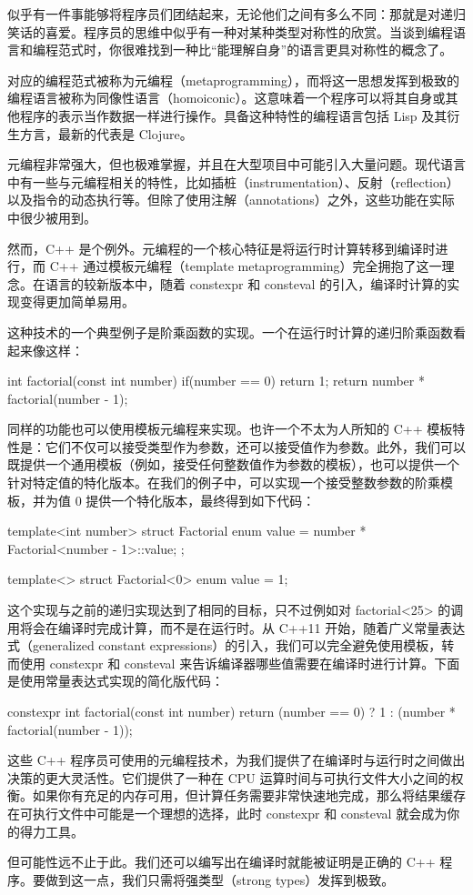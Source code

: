 
似乎有一件事能够将程序员们团结起来，无论他们之间有多么不同：那就是对递归笑话的喜爱。程序员的思维中似乎有一种对某种类型对称性的欣赏。当谈到编程语言和编程范式时，你很难找到一种比“能理解自身”的语言更具对称性的概念了。

对应的编程范式被称为元编程（metaprogramming），而将这一思想发挥到极致的编程语言被称为同像性语言（homoiconic）。这意味着一个程序可以将其自身或其他程序的表示当作数据一样进行操作。具备这种特性的编程语言包括 Lisp 及其衍生方言，最新的代表是 Clojure。

元编程非常强大，但也极难掌握，并且在大型项目中可能引入大量问题。现代语言中有一些与元编程相关的特性，比如插桩（instrumentation）、反射（reflection）以及指令的动态执行等。但除了使用注解（annotations）之外，这些功能在实际中很少被用到。

然而，C++ 是个例外。元编程的一个核心特征是将运行时计算转移到编译时进行，而 C++ 通过模板元编程（template metaprogramming）完全拥抱了这一理念。在语言的较新版本中，随着 constexpr 和 consteval 的引入，编译时计算的实现变得更加简单易用。

这种技术的一个典型例子是阶乘函数的实现。一个在运行时计算的递归阶乘函数看起来像这样：

\begin{cpp}
int factorial(const int number){
  if(number == 0) return 1;
  return number * factorial(number - 1);
}
\end{cpp}

同样的功能也可以使用模板元编程来实现。也许一个不太为人所知的 C++ 模板特性是：它们不仅可以接受类型作为参数，还可以接受值作为参数。此外，我们可以既提供一个通用模板（例如，接受任何整数值作为参数的模板），也可以提供一个针对特定值的特化版本。在我们的例子中，可以实现一个接受整数参数的阶乘模板，并为值 0 提供一个特化版本，最终得到如下代码：

\begin{cpp}
template<int number>
struct Factorial {
  enum { value = number * Factorial<number - 1>::value};
};

template<>
struct Factorial<0>{
  enum {value = 1};
}
\end{cpp}

这个实现与之前的递归实现达到了相同的目标，只不过例如对 factorial<25> 的调用将会在编译时完成计算，而不是在运行时。从 C++11 开始，随着广义常量表达式（generalized constant expressions）的引入，我们可以完全避免使用模板，转而使用 constexpr 和 consteval 来告诉编译器哪些值需要在编译时进行计算。下面是使用常量表达式实现的简化版代码：

\begin{cpp}
constexpr int factorial(const int number) {
  return (number == 0) ? 1 : (number * factorial(number - 1));
}
\end{cpp}

这些 C++ 程序员可使用的元编程技术，为我们提供了在编译时与运行时之间做出决策的更大灵活性。它们提供了一种在 CPU 运算时间与可执行文件大小之间的权衡。如果你有充足的内存可用，但计算任务需要非常快速地完成，那么将结果缓存在可执行文件中可能是一个理想的选择，此时 constexpr 和 consteval 就会成为你的得力工具。

但可能性远不止于此。我们还可以编写出在编译时就能被证明是正确的 C++ 程序。要做到这一点，我们只需将强类型（strong types）发挥到极致。




